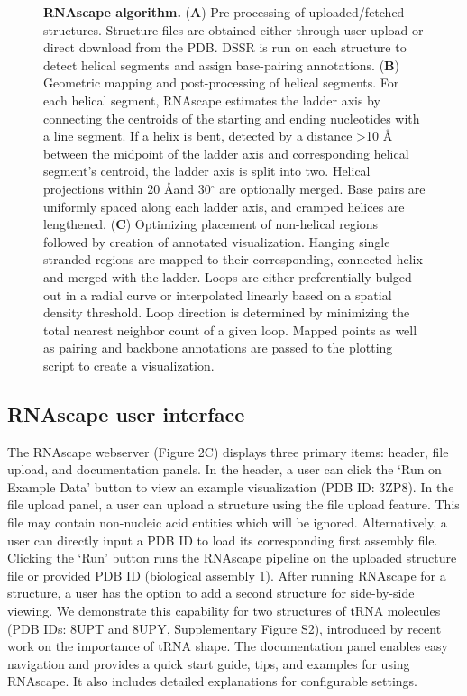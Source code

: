 \begin{center}
\begin{figure}
        \caption[RNAscape algorithm.]{\textbf{RNAscape algorithm.} ({\bf A})  Pre-processing of uploaded/fetched structures. Structure files are obtained either through user upload or direct download from the PDB. DSSR is run on each structure to detect helical segments and assign base-pairing annotations. ({\bf B}) Geometric mapping and post-processing of helical segments. For each helical segment, RNAscape estimates the ladder axis by connecting the centroids of the starting and ending nucleotides with a line segment. If a helix is bent, detected by a distance >10 Å between the midpoint of the ladder axis and corresponding helical segment's centroid, the ladder axis is split into two. Helical projections within 20 \AA and 30$^{\circ}$ are optionally merged. Base pairs are uniformly spaced along each ladder axis, and cramped helices are lengthened. ({\bf C}) Optimizing placement of non-helical regions followed by creation of annotated visualization. Hanging single stranded regions are mapped to their corresponding, connected helix and merged with the ladder. Loops are either preferentially bulged out in a radial curve or interpolated linearly based on a spatial density threshold. Loop direction is determined by minimizing the total nearest neighbor count of a given loop. Mapped points as well as pairing and backbone annotations are passed to the plotting script to create a visualization.}
  \label{fig:rnascape3}
\end{figure}
\end{center}
\subsection{RNAscape user interface}

The RNAscape webserver (Figure 2C) displays three primary items: header, file upload, and documentation panels. In the header, a user can click the ‘Run on Example Data’ button to view an example visualization (PDB ID: 3ZP8). In the file upload panel, a user can upload a structure using the file upload feature. This file may contain non-nucleic acid entities which will be ignored. Alternatively, a user can directly input a PDB ID to load its corresponding first assembly file. Clicking the ‘Run’ button runs the RNAscape pipeline on the uploaded structure file or provided PDB ID (biological assembly 1). After running RNAscape for a structure, a user has the option to add a second structure for side-by-side viewing. We demonstrate this capability for two structures of tRNA molecules (PDB IDs: 8UPT and 8UPY, Supplementary Figure S2), introduced by recent work \citep{Krahn2024} on the importance of tRNA shape. The documentation panel enables easy navigation and provides a quick start guide, tips, and examples for using RNAscape. It also includes detailed explanations for configurable settings.

